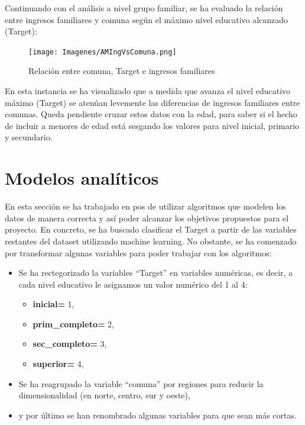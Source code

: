 \documentclass[a4paper]{article}
\begin{document}
        \newpage

        Continuando con el análisis a nivel grupo familiar, se ha evaluado la relación entre ingresos familiares y comuna según el máximo nivel educativo alcanzado (Target):
        \begin{figure}[H]
            \centering
            \texttt{[image: Imagenes/AMIngVsComuna.png]}
            \caption{Relación entre comuna, Target e ingresos familiares}
            \label{AM Location, Taget and Familiar Income}
        \end{figure}
 
        En esta instancia se ha visualizado que a medida que avanza el nivel educativo máximo (Target) se atenúan levemente las diferencias de ingresos familiares entre comunas. Queda pendiente cruzar estos datos con la edad, para saber si el hecho de incluir a menores de edad está sesgando los valores para nivel inicial, primario y secundario.
 
\newpage


\section{Modelos analíticos}

    En esta sección se ha trabajado en pos de utilizar algoritmos que modelen los datos de manera correcta y así poder alcanzar los objetivos propuestos para el proyecto. En concreto, se ha buscado clasificar el Target a partir de las variables restantes del dataset utilizando machine learning. 
    No obstante, se ha comenzado por transformar algunas variables para poder trabajar con los algoritmos:
    \begin{itemize}
        \item Se ha rectegorizado la variables ``Target'' en variables numéricas, es decir, a cada nivel educativo le asignamos un valor numérico del 1 al 4:
        \begin{itemize}
            \item \textbf{inicial=} 1,
            \item \textbf{prim\_completo=} 2,
            \item \textbf{sec\_completo=} 3,
            \item \textbf{superior=} 4,
        \end{itemize}
        \item Se ha reagrupado la variable ``comuna'' por regiones para reducir la dimensionalidad (en norte, centro, sur y oeste),
        \item y por último se han renombrado algunas variables para que sean más cortas.
    \end{itemize}
\end{document}

